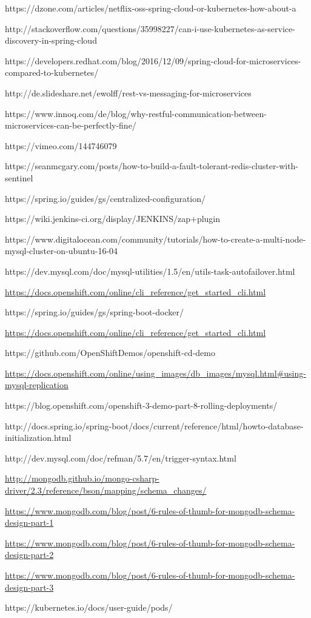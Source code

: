 https://dzone.com/articles/netflix-oss-spring-cloud-or-kubernetes-how-about-a

http://stackoverflow.com/questions/35998227/can-i-use-kubernetes-as-service-discovery-in-spring-cloud

https://developers.redhat.com/blog/2016/12/09/spring-cloud-for-microservices-compared-to-kubernetes/

http://de.slideshare.net/ewolff/rest-vs-messaging-for-microservices

https://www.innoq.com/de/blog/why-restful-communication-between-microservices-can-be-perfectly-fine/

https://vimeo.com/144746079

https://seanmcgary.com/posts/how-to-build-a-fault-tolerant-redis-cluster-with-sentinel

https://spring.io/guides/gs/centralized-configuration/

https://wiki.jenkins-ci.org/display/JENKINS/zap+plugin

https://www.digitalocean.com/community/tutorials/how-to-create-a-multi-node-mysql-cluster-on-ubuntu-16-04

https://dev.mysql.com/doc/mysql-utilities/1.5/en/utils-task-autofailover.html

\url{https://docs.openshift.com/online/cli_reference/get_started_cli.html}

https://spring.io/guides/gs/spring-boot-docker/

\url{https://docs.openshift.com/online/cli_reference/get_started_cli.html}

https://github.com/OpenShiftDemos/openshift-cd-demo

\url{https://docs.openshift.com/online/using_images/db_images/mysql.html#using-mysql-replication}

https://blog.openshift.com/openshift-3-demo-part-8-rolling-deployments/

http://docs.spring.io/spring-boot/docs/current/reference/html/howto-database-initialization.html

http://dev.mysql.com/doc/refman/5.7/en/trigger-syntax.html

\url{http://mongodb.github.io/mongo-csharp-driver/2.3/reference/bson/mapping/schema_changes/}

\url{https://www.mongodb.com/blog/post/6-rules-of-thumb-for-mongodb-schema-design-part-1}

\url{https://www.mongodb.com/blog/post/6-rules-of-thumb-for-mongodb-schema-design-part-2}

\url{https://www.mongodb.com/blog/post/6-rules-of-thumb-for-mongodb-schema-design-part-3}

https://kubernetes.io/docs/user-guide/pods/









